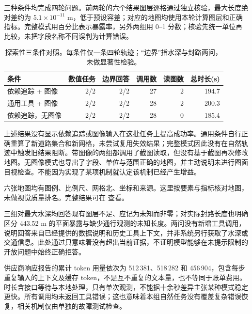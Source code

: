 三种条件均完成四轮问题。前两轮的六个结果图层逐格通过独立核验，最大长度绝对差约为 $5.1\times10^{-11}$ m，低于预设容差；对应的地图均使用本轮计算图层和正确指标。完整模式用百分比表示暴露率，另外两组用 0--1 分数；核验先统一单位再比较，未把字段名称不同误判为计算错误。

\begin{table}[H]
\centering
\caption{探索性三条件对照。每条件仅一条四轮轨迹；“边界”指水深与封路两问，未做显著性检验。}
\label{tab:gis-comparison}
\small
\begin{tabular}{lrrrrr}
\toprule
条件 & 数值任务 & 边界回答 & 调用数 & 读图数 & 总时长(s)\\
\midrule
依赖追踪 + 图像 &2/2&2/2&27&2&194.7\\
通用工具 + 图像 &2/2&2/2&28&2&200.3\\
依赖追踪，无图像 &2/2&2/2&28&0&185.4\\
\bottomrule
\end{tabular}
\end{table}

上述结果没有显示依赖追踪或图像输入在这批任务上提高成功率。通用条件自行正确重算了新道路集合和新网格，未尝试复用失效结果；完整模式因此没有在自然轨迹中触发旧结果阻断。带图像的两组都调用了截图读取，但没有基于截图再次修改地图。无图像模式也导出了字段、单位与范围正确的地图，并主动说明未进行图面目视检查。不能因为实现了某项机制就认定该机制已经产生增益。

六张地图均有图例、比例尺、网格北、坐标和来源。这里按要素与指标核对地图，未做视觉质量排名。完整结果可在  查看。

三组对最大水深均回答现有图层不足、应记为未知而非零；对实际封路长度也明确区分 443.52 m 的平面暴露与缺少通行观测的未知长度。两问没有新增工具调用，说明回答来自已经提供的数据说明和历史工具上下文，并非系统另行获取了水深或交通信息。此处通过只意味着没有超出当前证据，不证明模型能够在未提示限制的开放问题中始终正确拒答。

供应商响应报告的累计 token 用量依次为 512\,381、518\,282 和 456\,904，包含每步重复输入的上下文及缓存 token，不是互不重复的文本量，也不等同于账单费用。时长含接口等待与本地处理，只有单次观测，不能据十余秒差异主张某种模式稳定更快。所有调用均未返回工具错误；这也意味着本组自然任务没有覆盖复杂错误恢复，相关机制仅由单独的故障测试检查。
